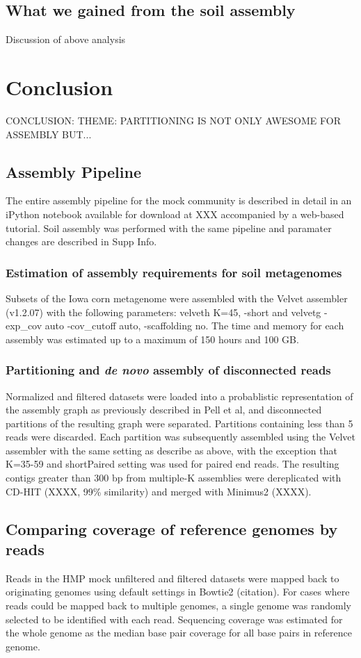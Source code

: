 \documentclass[11pt]{article} %
\begin{document}
\subsection{What we gained from the soil assembly}

Discussion of above analysis

\section{Conclusion}
CONCLUSION:  
THEME: PARTITIONING IS NOT ONLY AWESOME FOR ASSEMBLY BUT...


\subsection{Assembly Pipeline}
The entire assembly pipeline for the mock community is described in detail in an iPython notebook available for download at XXX accompanied by a web-based tutorial.  Soil assembly was performed with the same pipeline and paramater changes are described in Supp Info.

\subsubsection{Estimation of assembly requirements for soil metagenomes}
Subsets of the Iowa corn metagenome were assembled with the Velvet assembler (v1.2.07) with the following parameters:  velveth K=45, -short and velvetg -exp\_cov auto -cov\_cutoff auto, -scaffolding no.  The time and memory for each assembly was estimated up to a maximum of 150 hours and 100 GB.

\subsubsection{Partitioning and \emph{de novo} assembly of disconnected reads}
Normalized and filtered datasets were loaded into a probablistic representation of the assembly graph as previously described in Pell et al, and disconnected partitions of the resulting graph were separated.  Partitions containing less than 5 reads were discarded.  Each partition was subsequently assembled using the Velvet assembler with the same setting as describe as above, with the exception that K=35-59 and shortPaired setting was used for paired end reads.  The resulting contigs greater than 300 bp from multiple-K assemblies were dereplicated with CD-HIT (XXXX, 99\% similarity) and merged with Minimus2 (XXXX).  

\subsection{Comparing coverage of reference genomes by reads}
Reads in the HMP mock unfiltered and filtered datasets were mapped back to originating genomes using default settings in Bowtie2 (citation).  For cases where reads could be mapped back to multiple genomes, a single genome was randomly selected to be identified with each read.  Sequencing coverage was estimated for the whole genome as the median base pair coverage for all base pairs in reference genome.  
\end{document}
